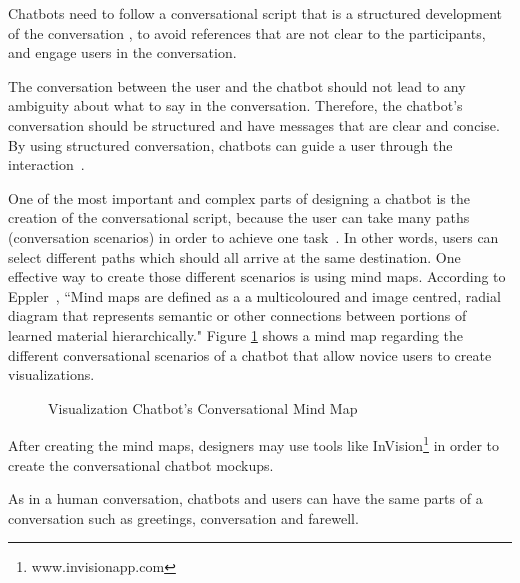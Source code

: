 \documentclass[a4paper,10pt]{article}
\begin{document}
Chatbots need to follow a conversational script that is a structured development of the conversation \cite{SmartNotesforBuildingaFeaturedBot}, to avoid references that are not clear to the participants, and engage users in the conversation.

The conversation between the user and the chatbot should not lead to any ambiguity about what to say in the conversation. Therefore, the chatbot's conversation should be structured and have messages that are clear and concise. By using structured conversation, chatbots can guide a user through the interaction~\cite{HeuristicsWebPage}.


One of the most important and complex parts of designing a chatbot is the creation of the conversational script, because the user can take many paths (conversation scenarios) in order to achieve one task~\cite{designChatbotConversatio}. In other words, users can select different paths which should all arrive at the same destination. One effective way to create those different scenarios is using mind maps. According to Eppler~\cite{eppler2006comparison}, ``Mind maps are defined as a a multicoloured and image centred, radial diagram that represents semantic or other connections between portions of learned material hierarchically." Figure \ref{FigureMindMap} shows a mind map regarding the different conversational scenarios of a chatbot that allow novice users to create visualizations. 


\begin{figure}
    \caption{Visualization Chatbot's Conversational Mind Map}
   \label{FigureMindMap}
\end{figure}

After creating the mind maps, designers may use tools like InVision\footnote{www.invisionapp.com} in order to create the conversational chatbot mockups.

As in a human conversation, chatbots and users can have the same parts of a conversation such as greetings,  conversation and farewell.
\end{document}
